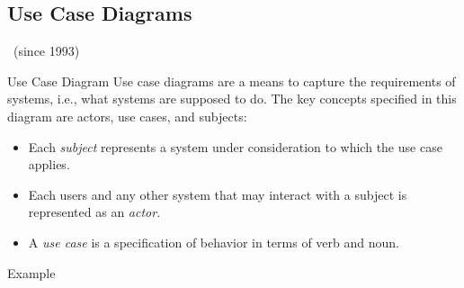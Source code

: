 \subsection{Use Case Diagrams}
\begin{frame}[label=usecaseslide]{\insertsubsection\ \normalsize(since 1993)}
	\begin{fancycolumns}[animation=none]
		\begin{definition}{Use Case Diagram }
			Use case diagrams are a means to capture the requirements of systems, i.e., what systems are supposed to do. The key concepts specified in this diagram are actors, use cases, and subjects:%
			\begin{itemize}
				\item Each \emph{subject} represents a system under consideration to which the use case applies. 
				\item Each users and any other system that may interact with a subject is represented as an \emph{actor}. 
				\item A \emph{use case} is a specification of behavior in terms of verb and noun. 
			\end{itemize}
		\end{definition}
		\nextcolumn
	\end{fancycolumns}
\end{frame}

\begin{frame}{Example}
\end{frame}

